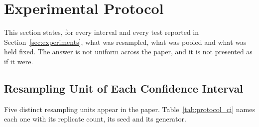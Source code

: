 
\section{Experimental Protocol}\label{sec:protocol}

This section states, for every interval and every test reported in
Section~\ref{sec:experiments}, what was resampled, what was pooled and what was held fixed. The
answer is not uniform across the paper, and it is not presented as if it were.

\subsection{Resampling Unit of Each Confidence Interval}\label{sec:protocol_ci}

Five distinct resampling units appear in the paper. Table~\ref{tab:protocol_ci} names each one
with its replicate count, its seed and its generator.

